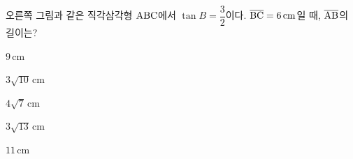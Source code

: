 \noindent\begin{minipage}[t]{0.58\linewidth}\vspace{0pt}\raggedright 오른쪽 그림과 같은 직각삼각형 $\mathrm{ABC}$에서 $\tan B=\dfrac{3}{2}$이다. $\overline{\mathrm{BC}}=6\,\mathrm{cm}$일 때, $\overline{\mathrm{AB}}$의 길이는?\end{minipage}\hfill\begin{minipage}[t]{0.4\linewidth}\vspace{0pt}\centering \resizebox{\ifdim\width>\linewidth\linewidth\else\width\fi}{!}{}\end{minipage}\par
\begin{choicesii}{\rule[-3ex]{0pt}{8ex}$9\,\mathrm{cm}$}{\rule[-3ex]{0pt}{8ex}$3\sqrt{10}\,\mathrm{cm}$}{\rule[-3ex]{0pt}{8ex}$4\sqrt{7}\,\mathrm{cm}$}{\rule[-3ex]{0pt}{8ex}$3\sqrt{13}\,\mathrm{cm}$}{\rule[-3ex]{0pt}{8ex}$11\,\mathrm{cm}$}\end{choicesii}
